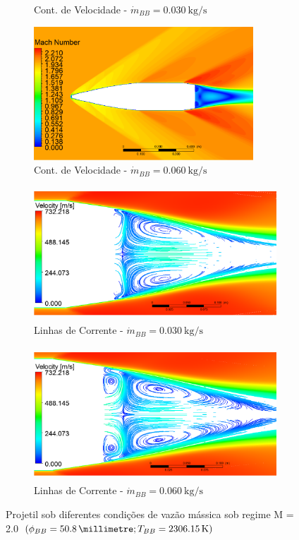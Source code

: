 \begin{figure}[!ht]
\begin{subfigure}[b]{0.47\textwidth}
        \caption{Cont. de Velocidade - $\Dot{m}_{BB} = \qty{0,030}{\kilogram\per\second}$}
        \label{fig:contorno-velocidade-bb-2pol-vazao-0030}
    \end{subfigure}
    \hfill
	\begin{subfigure}[b]{0.47\textwidth}
        \centering
        \includegraphics[height=5cm,width=\textwidth]{contorno-velocidade-2306K-vazao-0060-2pol.png}
        \caption{Cont. de Velocidade - $\Dot{m}_{BB} = \qty{0,060}{\kilogram\per\second}$}
        \label{fig:contorno-velocidade-bb-2pol-vazao-0060}
    \end{subfigure}
	\hfill
	\begin{subfigure}[b]{0.47\textwidth}
        \centering
        \includegraphics[height=5cm,width=\textwidth]{corrente-velocidade-2306K-vazao-0030-2pol.png}
        \caption{Linhas de Corrente - $\Dot{m}_{BB} = \qty{0,030}{\kilogram\per\second}$}
        \label{fig:corrente-velocidade-bb-2pol-vazao-0030}
    \end{subfigure}
    \hfill
    \begin{subfigure}[b]{0.47\textwidth}
        \centering
        \includegraphics[height=5cm,width=\textwidth]{corrente-velocidade-2306K-vazao-0060-2pol.png}
        \caption{Linhas de Corrente - $\Dot{m}_{BB} = \qty{0,060}{\kilogram\per\second}$}
	\label{fig:corrente-velocidade-bb-2pol-vazao-0060}
    \end{subfigure}
	\caption{Projetil sob diferentes condições de vazão mássica sob regime M = \num{2,0} $\left(\phi_{BB} = \qty{50,8}{\millimetre}; T_{BB} = \qty{2306,15}{\kelvin}\right)$}
	\label{fig:influencia-diametro-vazao-2pol}
\end{figure}

